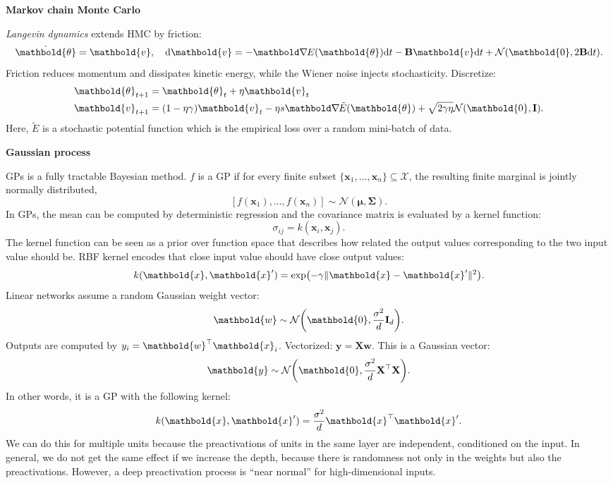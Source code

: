 \documentclass[10pt]{article}
\newenvironment{topic}[1]
{\textbf{\sffamily \footnotesize \colorbox{black}{\rlap{\textbf{\textcolor{white}{#1}}}\hspace{\linewidth}\hspace{-2\fboxsep}}}}
{}
\newenvironment{subtopic}[1]
{\begin{center}\textbf{\footnotesize \sffamily #1}\end{center}}
{}
\renewcommand{\mat}[1]{\ensuremath{\mathbf{#1}}}
\renewcommand{\vec}[1]{\ensuremath{\mathbold{#1}}}
\begin{document}
\begin{multicols*}{3}
\begin{topic}{Bayesian learning}
\begin{subtopic}{Markov chain Monte Carlo}
            \textit{Langevin dynamics} extends HMC by friction: \[
                \dot{\vec{\theta}} = \vec{v}, \quad \mathrm{d}\vec{v} = -\grad{E(\vec{\theta})}{} \mathrm{d}t - \mat{B} \vec{v}\mathrm{d}t + \mathcal{N}(\vec{0}, 2 \mat{B} \mathrm{d}t).
            \]
            Friction reduces momentum and dissipates kinetic energy, while the Wiener noise injects
            stochasticity. Discretize:
            \begin{align*}
                \vec{\theta}_{t+1} & = \vec{\theta}_t + \eta \vec{v}_t                                                                                           \\
                \vec{v}_{t+1}      & = (1-\eta \gamma) \vec{v}_t - \eta s \grad{\tilde{E}(\vec{\theta})}{} + \sqrt{2 \gamma \eta} \mathcal{N}(\vec{0}, \mat{I}).
            \end{align*}
            Here, $\tilde{E}$ is a stochastic potential function which is the empirical loss over a random
            mini-batch of data.
        \end{subtopic}

        \begin{subtopic}{Gaussian process}
            GPs is a fully tractable Bayesian method. $f$ is a GP if for every finite subset $\{ \vec{x}_1, \ldots, \vec{x}_n \} \subseteq \mathcal{X}$, the resulting finite marginal is jointly normally distributed, \[
                [f(\vec{x}_1), \ldots, f(\vec{x}_n)] \sim \mathcal{N}(\vec{\mu}, \mat{\Sigma}).
            \]
            In GPs, the mean can be computed by deterministic regression and the covariance matrix is evaluated
            by a kernel function: \[
                \sigma_{ij} = k(\vec{x}_i, \vec{x}_j).
            \]
            The kernel function can be seen as a prior over function space that describes how related the
            output values corresponding to the two input value should be. RBF kernel encodes that close input
            value should have close output values: \[
                k(\vec{x}, \vec{x}') = \exp \lft( -\gamma \| \vec{x} - \vec{x}' \|^2 \rgt).
            \]
            Linear networks assume a random Gaussian weight vector: \[
                \vec{w} \sim \mathcal{N}\lft(\vec{0}, \frac{\sigma^2}{d} \mat{I}_d\rgt).
            \]
            Outputs are computed by $y_i = \transpose{\vec{w}}\vec{x}_i$. Vectorized: $\vec{y} = \mat{X} \vec{w}$.
            This is a Gaussian vector: \[
                \vec{y} \sim \mathcal{N}\lft(\vec{0}, \frac{\sigma^2}{d} \transpose{\mat{X}} \mat{X} \rgt).
            \]
            In other words, it is a GP with the following kernel: \[
                k(\vec{x}, \vec{x}') = \frac{\sigma^2}{d} \transpose{\vec{x}}\vec{x}'.
            \]
            We can do this for multiple units because the preactivations of units in the same layer are
            independent, conditioned on the input. In general, we do not get the same effect if we increase the
            depth, because there is randomness not only in the weights but also the preactivations. However, a
            deep preactivation process is ``near normal'' for high-dimensional inputs.


\end{subtopic}
\end{topic}
\end{multicols*}
\end{document}
